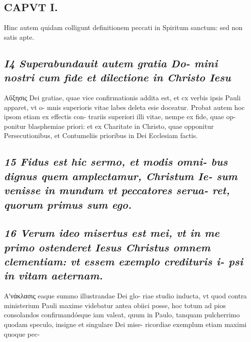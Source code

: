 \documentclass{article}
\begin{document}
\begin{pages}
\section*{CAPVT I. }
\marginpar{[ p.27 ]}\pstart Hinc autem quidam colligunt definitionem peccati in Spiritum sanctum: sed non satis apte.  \pend
{}
{}
\subsection*{\textit{I4 Superabundauit autem gratia Do- mini nostri cum fide et dilectione in Christo Iesu }}\pstart Αὔξησις Dei gratiae, quae vice confirmationis addita est, et cx verbis ipsis Pauli apparet, vt o- mnis superioris vitae labes deleta esie doceatur. Probat autem hoc ipsom etiam ex effectis con- trariis superiori illi vitae, nempe ex fide, quae op- ponitur blasphemiae priori: et ex Charitate in Christo, quae opponitur Persecutionibus, et Contumeliis prioribus in Dei Ecclesiam factis.  \pend
{}
{}
\subsection*{\textit{15 Fidus est hic sermo, et modis omni- bus dignus quem amplectamur, Christum Ie- sum venisse in mundum vt peccatores serua- ret, quorum primus sum ego. }}
{}
\subsection*{\textit{16 Verum ideo misertus est mei, vt in me primo ostenderet Iesus Christus omnem clementiam: vt essem exemplo credituris i- psi in vitam aeternam. }}\pstart Αʹνάκλασις eaque summo illustrandae Dei glo- riae studio inducta, vt quod contra ministerium Pauli maxime videbatur antea obiici posse, hoc totum ad pios consolandos confirmandósque iam valeat, quum in Paulo, tanquam pulcherrimo quodam speculo, insigne et singulare Dei mise- ricordiae exemplum etiam maximi quoque pec-  \pend

\end{pages}
\end{document}

